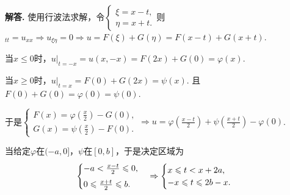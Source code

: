 \documentclass[12pt, a4paper, oneside]{ctexart}
\newenvironment{solution}{\par\noindent\textbf{解答. }}{\smallskip\par}
\let\leq=\leqslant %
\let\geq=\geqslant %
\def\add{\vspace{1ex}}      %
\begin{document}
\begin{solution}
    使用行波法求解，令$\begin{cases}
        \xi = x-t,\\
        \eta = x+t.
    \end{cases}$则$_{tt}=u_{xx}\Rightarrow u_{\xi\eta} = 0\Rightarrow u = F(\xi)+G(\eta) = F(x-t)+G(x+t)$.

    当$x\leq 0$时，$u|_{t=-x} = u(x,-x) = F(2x)+G(0) = \varphi(x)$.

    当$x\geq 0$时，$u|_{t=x} = F(0)+G(2x)=\psi(x)$. 且$F(0)+G(0) = \varphi(0) = \psi(0)$.\add

    于是$\begin{cases}
        F(x) = \varphi(\frac{x}{2})-G(0),\\
        G(x) = \psi(\frac{x}{2})-F(0).
    \end{cases}\Rightarrow u = \varphi(\frac{x-t}{2})+\psi(\frac{x+t}{2})-\varphi(0)$.\add

    当给定$\varphi$在$(-a,0]$，$\psi$在$[0,b]$，于是决定区域为
    \begin{equation*}
        \begin{cases}
            -a < \frac{x-t}{2}\leq 0,\add\\
            0\leq \frac{x+t}{2}\leq b.
        \end{cases}\Rightarrow \begin{cases}
            x\leq t < x+2a,\\
            -x\leq t\leq 2b-x.
        \end{cases}
    \end{equation*}
\end{solution}

\end{document}
